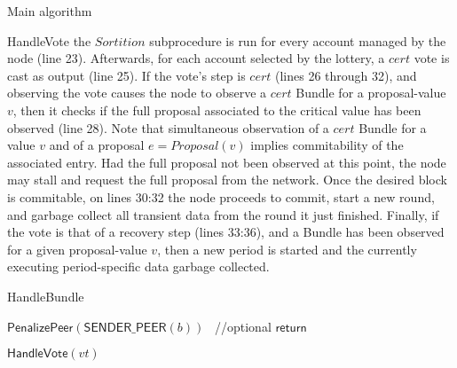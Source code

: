 \documentclass[10pt,a4paper]{article}
\begin{document}
\begin{section}{Main algorithm}
\begin{subsection}{HandleVote}
the $Sortition$ subprocedure is run for every account managed by the node (line 23). Afterwards, for each account selected by
the lottery, a $cert$ vote is cast as output (line 25).
If the vote's step is $cert$ (lines 26 through 32), and observing the vote causes the node to observe a $cert$ Bundle for a proposal-value $v$,
then it checks if the full proposal associated to the critical value has been observed (line 28). Note that simultaneous observation of a $cert$ Bundle 
for a value $v$ and of a proposal $e = Proposal(v)$ implies commitability of the associated entry.
Had the full proposal not been observed at this point, the node may stall and request the full proposal from the network.
Once the desired block is commitable, on lines 30:32 the node proceeds to commit, start a new round, and garbage collect all
transient data from the round it just finished.
Finally, if the vote is that of a recovery step (lines 33:36), and a Bundle has been observed for a given proposal-value $v$,
then a new period is started and the currently executing period-specific data garbage collected.



\end{subsection}


\begin{subsection}{HandleBundle}\label{ssect:HandleBundle}

    \begin{algorithm}[H]
        \begin{algorithmic}[1]



                \State $\mathsf{PenalizePeer}(\mathsf{SENDER\_PEER}(b))$ \ //optional
                \State $\mathsf{return}$
            \EndIf

                    \State $\mathsf{HandleVote}(vt)$
                \EndFor
            \EndIf


\end{algorithmic}
\end{algorithm}
\end{subsection}
\end{section}
\end{document}
